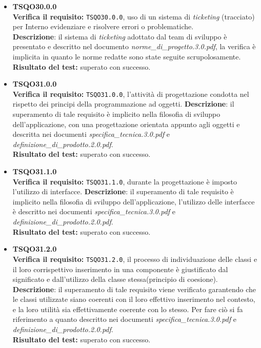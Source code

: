 \begin{itemize}
\item \textbf{TSQO30.0.0}\\
\textbf{Verifica il requisito:} \texttt{TSQO30.0.0}, uso di un sistema di \textit{ticketing} (tracciato) per Interno evidenziare e risolvere errori o problematiche.\\
\textbf{Descrizione}: il sistema di \textit{ticketing} adottato dal team di sviluppo è presentato e descritto nel documento \textit{norme\_di\_progetto.3.0.pdf}, la verifica è implicita in quanto le norme redatte sono state seguite scrupolosamente.\\
\textbf{Risultato del test:} superato con successo.

\item \textbf{TSQO31.0.0}\\
\textbf{Verifica il requisito:} \texttt{TSQO31.0.0}, l'attività di progettazione condotta nel rispetto dei principi della programmazione ad oggetti.
\textbf{Descrizione}: il superamento di tale requisito è implicito nella filosofia di sviluppo dell'applicazione, con una progettazione orientata appunto agli oggetti e descritta nei documenti \textit{specifica\_tecnica.3.0.pdf} e \textit{definizione\_di\_prodotto.2.0.pdf}.\\
\textbf{Risultato del test:} superato con successo.

\item \textbf{TSQO31.1.0}\\
\textbf{Verifica il requisito:} \texttt{TSQO31.1.0}, durante la progettazione è imposto l'utilizzo di interfacce.
\textbf{Descrizione}: il superamento di tale requisito è implicito nella filosofia di sviluppo dell'applicazione, l'utilizzo delle interfacce è descritto nei documenti \textit{specifica\_tecnica.3.0.pdf} e \textit{definizione\_di\_prodotto.2.0.pdf}.\\
\textbf{Risultato del test:} superato con successo.

\item \textbf{TSQO31.2.0}\\
\textbf{Verifica il requisito:} \texttt{TSQO31.2.0}, il processo di individuazione delle classi e il loro corrispettivo inserimento in una componente è giustificato dal significato e dall'utilizzo della classe stessa(principio di coesione).
\textbf{Descrizione}: il superamento di tale requisito viene verificato garantendo che le classi utilizzate siano coerenti con il loro effettivo inserimento nel contesto, e la loro utilità sia effettivamente coerente con lo stesso. Per fare ciò si fa riferimento a quanto descritto nei documenti \textit{specifica\_tecnica.3.0.pdf} e \textit{definizione\_di\_prodotto.2.0.pdf}.\\
\textbf{Risultato del test:} superato con successo.

\end{itemize}

